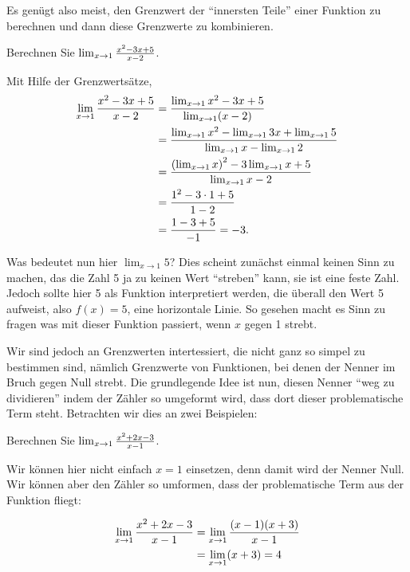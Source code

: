 Es genügt also meist, den Grenzwert der ``innersten Teile'' einer Funktion zu berechnen und dann diese Grenzwerte zu kombinieren. 


\begin{example}
Berechnen Sie $\lim_{x\to 1}{x^2-3x+5\over x-2}$. 
\end{example}

\begin{solution}
Mit Hilfe der Grenzwertsätze, 
\begin{align*}
\lim_{x\to 1}{x^2-3x+5\over x-2}&=
\dfrac{\lim_{x\to 1}x^2-3x+5}{\lim_{x\to1}(x-2)} \\
&=\frac{\lim_{x\to 1}x^2-\lim_{x\to1}3x+\lim_{x\to1}5}{\lim_{x\to1}x-\lim_{x\to1}2} \\
&=\dfrac{\left(\lim_{x\to 1}x\right)^2-3\lim_{x\to1}x+5}{\lim_{x\to1}x-2} \\
&=\dfrac{1^2-3\cdot1+5}{1-2} \\
&=\dfrac{1-3+5}{-1} = -3.
\end{align*}
\end{solution}

Was bedeutet nun hier $\lim_{x\to1}5$? Dies scheint zunächst einmal keinen Sinn zu machen, das die Zahl 5 ja zu keinen Wert ``streben'' kann, sie ist eine feste Zahl. Jedoch sollte hier 5 als Funktion interpretiert werden, die überall den Wert 5 aufweist, also $f(x)=5$, eine horizontale Linie. So gesehen macht es Sinn zu fragen was mit dieser Funktion passiert, wenn $x$ gegen 1 strebt.

Wir sind jedoch an Grenzwerten intertessiert, die nicht ganz so simpel zu bestimmen sind, nämlich Grenzwerte von Funktionen, bei denen der Nenner im Bruch gegen Null strebt. Die grundlegende Idee ist nun, diesen Nenner ``weg zu dividieren'' indem der Zähler so umgeformt wird, dass dort dieser problematische Term steht. Betrachten wir dies an zwei Beispielen:



\begin{example}
Berechnen Sie $\lim_{x\to1}{x^2+2x-3\over x-1}$. 
\end{example}
\begin{solution}
Wir können hier nicht einfach $x=1$ einsetzen, denn damit wird der Nenner Null. Wir können aber den Zähler so umformen, dass der problematische Term aus der Funktion fliegt:

\begin{align*}
\lim_{x\to1}{x^2+2x-3\over x-1}&=\lim_{x\to1}{(x-1)(x+3)\over x-1} \\
&=\lim_{x\to1}(x+3)=4
\end{align*}
\end{solution}

